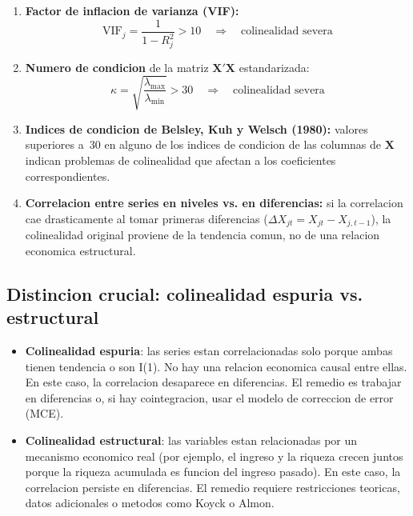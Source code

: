 \documentclass[12pt, letterpaper]{article}
\theoremstyle{remark}
\begin{document}
\begin{enumerate}[leftmargin=1.8em, itemsep=6pt]
  \item \textbf{Factor de inflacion de varianza (VIF):}
    \begin{equation}
      \text{VIF}_j = \frac{1}{1 - R_j^2} > 10 \quad \Rightarrow \quad
      \text{colinealidad severa}
      \label{eq:VIF_criterio}
    \end{equation}

  \item \textbf{Numero de condicion} de la matriz $\mathbf{X'X}$
    estandarizada:
    \begin{equation}
      \kappa = \sqrt{\frac{\lambda_{\max}}{\lambda_{\min}}} > 30
      \quad \Rightarrow \quad \text{colinealidad severa}
      \label{eq:kappa}
    \end{equation}

  \item \textbf{Indices de condicion de Belsley, Kuh y Welsch (1980):}
    valores superiores a~30 en alguno de los indices de condicion de las
    columnas de $\mathbf{X}$ indican problemas de colinealidad que afectan
    a los coeficientes correspondientes.

  \item \textbf{Correlacion entre series en niveles vs. en diferencias:}
    si la correlacion cae drasticamente al tomar primeras diferencias
    ($\Delta X_{jt} = X_{jt} - X_{j,t-1}$), la colinealidad original
    proviene de la tendencia comun, no de una relacion economica estructural.
\end{enumerate}

\subsection{Distincion crucial: colinealidad espuria vs. estructural}

\begin{itemize}[leftmargin=1.6em, itemsep=5pt]
  \item \textbf{Colinealidad espuria}: las series estan correlacionadas
    solo porque ambas tienen tendencia o son I(1). No hay una relacion
    economica causal entre ellas. En este caso, la correlacion desaparece
    en diferencias. El remedio es trabajar en diferencias o, si hay
    cointegracion, usar el modelo de correccion de error (MCE).

  \item \textbf{Colinealidad estructural}: las variables estan relacionadas
    por un mecanismo economico real (por ejemplo, el ingreso y la riqueza
    crecen juntos porque la riqueza acumulada es funcion del ingreso pasado).
    En este caso, la correlacion persiste en diferencias. El remedio requiere
    restricciones teoricas, datos adicionales o metodos como Koyck o Almon.
\end{itemize}
\end{document}
